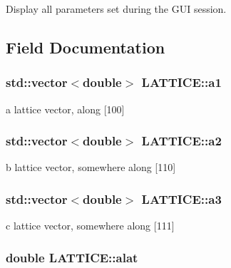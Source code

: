 Display all parameters set during the G\+U\+I session. 



\subsection{Field Documentation}
\hypertarget{class_l_a_t_t_i_c_e_a9a56f2f8e797ae6a496527f1ba937769}{}
\subsubsection[{a1}]{\setlength{\rightskip}{0pt plus 5cm}std\+::vector$<$double$>$ L\+A\+T\+T\+I\+C\+E\+::a1}\label{class_l_a_t_t_i_c_e_a9a56f2f8e797ae6a496527f1ba937769}


a lattice vector, along \mbox{[}100\mbox{]} 

\hypertarget{class_l_a_t_t_i_c_e_a7f6dbfc6795b67a0d92b156789bb8977}{}
\subsubsection[{a2}]{\setlength{\rightskip}{0pt plus 5cm}std\+::vector$<$double$>$ L\+A\+T\+T\+I\+C\+E\+::a2}\label{class_l_a_t_t_i_c_e_a7f6dbfc6795b67a0d92b156789bb8977}


b lattice vector, somewhere along \mbox{[}110\mbox{]} 

\hypertarget{class_l_a_t_t_i_c_e_a5f5355169d092e243480783bde501ccd}{}
\subsubsection[{a3}]{\setlength{\rightskip}{0pt plus 5cm}std\+::vector$<$double$>$ L\+A\+T\+T\+I\+C\+E\+::a3}\label{class_l_a_t_t_i_c_e_a5f5355169d092e243480783bde501ccd}


c lattice vector, somewhere along \mbox{[}111\mbox{]} 

\hypertarget{class_l_a_t_t_i_c_e_a0b631e7b0ab66a25bf15fbf49d684f07}{}
\subsubsection[{alat}]{\setlength{\rightskip}{0pt plus 5cm}double L\+A\+T\+T\+I\+C\+E\+::alat}\label{class_l_a_t_t_i_c_e_a0b631e7b0ab66a25bf15fbf49d684f07}


